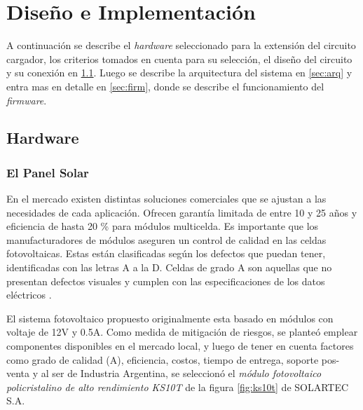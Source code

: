 
\chapter{Diseño e Implementación} %

\label{Chapter3} %

A continuación se describe el \textit{hardware} seleccionado para la extensión del circuito cargador, los criterios tomados en cuenta para su selección, el diseño del circuito y su conexión en \ref{sec:hard}. Luego se describe la arquitectura del sistema en \ref{sec:arq} y entra mas en detalle en \ref{sec:firm}, donde se describe el funcionamiento del \textit{firmware}. 

\section{Hardware}
\label{sec:hard}

\subsection{El Panel Solar}
\label{subsec:panel} 
En el mercado existen distintas soluciones comerciales que se ajustan a las necesidades de cada aplicación. Ofrecen garantía limitada de entre 10 y 25 años y eficiencia de hasta 20 \% para módulos multicelda.
Es importante que los manufacturadores de módulos aseguren un control de calidad en las celdas fotovoltaicas. Estas están clasificadas según los defectos que puedan tener, identificadas con las letras A a la D. Celdas de grado A son aquellas que no presentan defectos visuales y cumplen con las especificaciones de los datos eléctricos \citep{grado}.

El sistema fotovoltaico propuesto originalmente esta basado en módulos con voltaje de 12V y 0.5A. Como medida de mitigación de riesgos, se planteó emplear componentes disponibles en el mercado local, y luego de tener en cuenta factores como grado de calidad (A), eficiencia, costos, tiempo de entrega, soporte pos-venta y al ser de Industria Argentina, se seleccionó el \textit{módulo fotovoltaico policristalino de alto rendimiento KS10T} \citep{solar} de la figura \ref{fig:ks10t} de SOLARTEC S.A.

